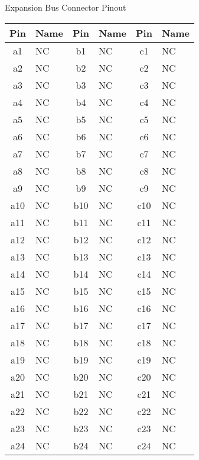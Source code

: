 \documentclass{article}
\begin{document}
	\begin{centering}

	\begin{threeparttable}
	\caption{Expansion Bus Connector Pinout}
	\begin{tabularx}{\textwidth}
		{| c | X || c | X || c | X |}
		\hline
		Pin & Name & Pin & Name & Pin & Name \\
		\hline\hline
		a1  & NC\tnote{1}	& b1  &	NC		& c1  &	NC 		\\
		\hline
		a2  & NC		& b2  &	NC		& c2  &	NC 		\\
		\hline
		a3  & NC		& b3  &	NC		& c3  &	NC 		\\
		\hline
		a4  & NC		& b4  &	NC		& c4  &	NC 		\\
		\hline
		a5  & NC		& b5  &	NC		& c5  &	NC 		\\
		\hline
		a6  & NC		& b6  &	NC		& c6  &	NC 		\\
		\hline
		a7  & NC		& b7  &	NC		& c7  &	NC 		\\
		\hline
		a8  & NC		& b8  &	NC		& c8  &	NC 		\\
		\hline
		a9  & NC		& b9  &	NC		& c9  &	NC 		\\
		\hline
		a10 & NC		& b10 &	NC		& c10 &	NC 		\\
		\hline
		a11 & NC		& b11 &	NC		& c11 &	NC 		\\
		\hline
		a12 & NC		& b12 &	NC		& c12 &	NC 		\\
		\hline
		a13 & NC		& b13 &	NC		& c13 &	NC 		\\
		\hline
		a14 & NC		& b14 &	NC		& c14 &	NC 		\\
		\hline
		a15 & NC		& b15 &	NC		& c15 &	NC 		\\
		\hline
		a16 & NC		& b16 &	NC		& c16 &	NC 		\\
		\hline
		a17 & NC		& b17 &	NC		& c17 &	NC 		\\
		\hline
		a18 & NC		& b18 &	NC		& c18 &	NC 		\\
		\hline
		a19 & NC		& b19 &	NC		& c19 &	NC 		\\
		\hline
		a20 & NC		& b20 &	NC		& c20 &	NC 		\\
		\hline
		a21 & NC		& b21 &	NC		& c21 &	NC 		\\
		\hline
		a22 & NC		& b22 &	NC		& c22 &	NC 		\\
		\hline
		a23 & NC		& b23 &	NC		& c23 &	NC 		\\
		\hline
		a24 & NC		& b24 &	NC		& c24 &	NC 		\\

\end{tabularx}
\end{threeparttable}
\end{centering}
\end{document}
